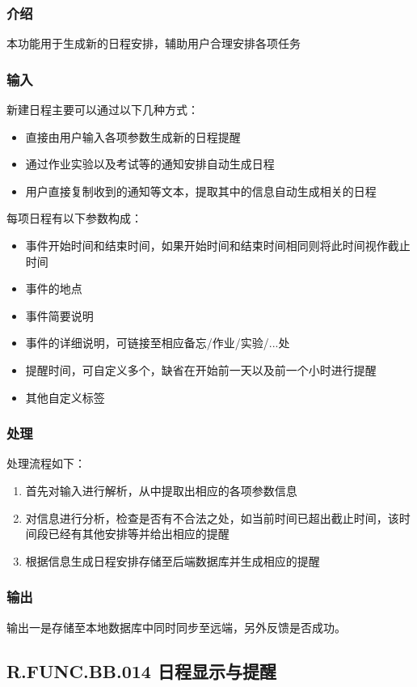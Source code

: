 \begin{enumerate}
    \subsubsection{介绍}
    本功能用于生成新的日程安排，辅助用户合理安排各项任务
    \subsubsection{输入}
    新建日程主要可以通过以下几种方式：
    \begin{itemize}
      \item 直接由用户输入各项参数生成新的日程提醒
      \item 通过作业实验以及考试等的通知安排自动生成日程
      \item 用户直接复制收到的通知等文本，提取其中的信息自动生成相关的日程
    \end{itemize}
    每项日程有以下参数构成：
    \begin{itemize}
      \item 事件开始时间和结束时间，如果开始时间和结束时间相同则将此时间视作截止时间
      \item 事件的地点
      \item 事件简要说明
      \item 事件的详细说明，可链接至相应备忘/作业/实验/...处
      \item 提醒时间，可自定义多个，缺省在开始前一天以及前一个小时进行提醒
      \item 其他自定义标签
    \end{itemize}
    \subsubsection{处理}
    处理流程如下：
    \begin{enumerate}
      \item 首先对输入进行解析，从中提取出相应的各项参数信息
      \item 对信息进行分析，检查是否有不合法之处，如当前时间已超出截止时间，该时间段已经有其他安排等并给出相应的提醒
      \item 根据信息生成日程安排存储至后端数据库并生成相应的提醒
    \end{enumerate}
    \subsubsection{输出}
    输出一是存储至本地数据库中同时同步至远端，另外反馈是否成功。

  \subsection{R.FUNC.BB.014 日程显示与提醒}

\end{enumerate}
